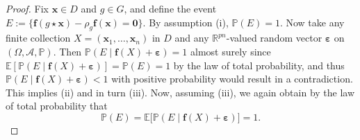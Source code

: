 \documentclass[11pt,a4paper]{article}
\newcommand{\R}{\mathbb{R}}
\newcommand{\bff}{\boldsymbol{f}}
\newcommand{\bx}{\boldsymbol{x}}
\begin{document}
\begin{proof}
Fix $\bx\in D$ and $g\in G$, and define the event $E:=\{\bff(g\star\bx)-\rho_g\bff(\bx)=\bm 0\}$. By assumption (i), $\mathbb{P}(E)=1$. Now take any finite collection $X = \left(\bx_{1},\dots,\bx_{n}\right)$ in $D$ and any $\R^{pn}$-valued random vector $\boldsymbol{\varepsilon}$ on $(\Omega, \mathcal{A}, \mathbb{P})$.
Then $\mathbb{P}(E\mid \bff(X)+\boldsymbol{\varepsilon})=1$ almost surely since $\mathbb{E}[\mathbb{P}(E\mid \bff(X)+\boldsymbol{\varepsilon})]=\mathbb{P}(E)=1$ by the law of total probability, and thus $\mathbb{P}(E\mid \bff(X)+\boldsymbol{\varepsilon})<1$ with positive probability would result in a contradiction. This implies (ii) and in turn (iii). Now, assuming (iii), we again obtain by the law of total probability that
\begin{equation}
\mathbb{P}(E)=\mathbb{E}\big[\mathbb{P}(E\mid \bff(X)+\boldsymbol{\varepsilon})\big]=1.
\end{equation}

\end{proof}
\end{document}
